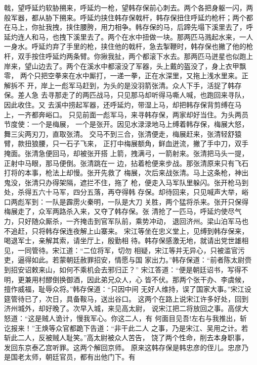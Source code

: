 戟，望呼延灼软胁搠来，呼延灼一枪，望韩存保前心刺去。两个各把身躯一闪，两
般军器，都从胁下搠来。呼延灼挟住韩存保戟杆，韩存保扭住呼延灼枪杆；两个都
在马上，你扯我拽，挟住腰胯，用力相争。韩存保的马，后蹄先塌下溪里去了，呼
延灼连人和马，也拽下溪里去了。两个在水中扭做一块。那两匹马溅起水来，一人
一身水。呼延灼弃了手里的枪，挟住他的戟杆，急去掣鞭时，韩存保也撇了他的枪
杆，双手按住呼延灼两条臂。你揪我扯，两个都滚下水去。那两匹马迸星也似跑上
岸来，望山边去了。两个在溪水中都滚没了军器，头上戴的盔没了，身上衣甲飘零，
两个只把空拳来在水中厮打，一递一拳，正在水深里，又拖上浅水里来。正解拆不
开，岸上一彪军马赶到，为头的是没羽箭张清。众人下手，活捉了韩存保。差人急
去寻那走了的两匹战马，只见那马却听得马嘶人喊，也跑回来寻队，因此收住。又
去溪中捞起军器，还呼延灼，带湿上马，却把韩存保背剪缚在马上，一齐都奔峪口。
只见前面一彪军马，来寻韩存保，两家却好当住。为头两员节度使：一个是梅展，
一个是张开。因见水渌渌地马上缚着韩存保，梅展大怒，舞三尖两刃刀，直取张清。
交马不到三合，张清便走，梅展赶来，张清轻舒猿臂，款扭狼腰，只一石子飞来，
正打中梅展额角，鲜血迸流，撇了手中刀，双手掩面。张清急便回马，却被张开搭
上箭，拽满弓，一箭射来。张清把马头一提，正射中马眼，那马便倒。张清跳在一
边，拈着枪便来步战。那张清原来只有飞石打将的本事，枪法上却慢。张开先救了
梅展，次后来战张清。马上这条枪，神出鬼没，张清只办得架隔，遮拦不住，拖了
枪，便走入马军队里躲闪。张开枪马到处，杀得五六十马军，四分五落，再夺得韩
存保。却待回来，只见喊声大举，峪口两彪军到：一队是霹雳火秦明，一队是大刀
关胜，两个猛将杀来。张开只保得梅展走了，众军两路杀入来，又夺了韩存保。张
清抢了一匹马，呼延灼使尽气力，只好随众厮杀，一齐掩击到官军队前，乘势冲动，
退回济州。梁山泊军马也不追赶，只将韩存保连夜解上山寨来。
宋江等坐在忠义堂上，见缚到韩存保来，喝退军士，亲解其索，请坐厅上，殷勤相
待。韩存保感激无地，就请出党世雄相见，一同管待。宋江道：“二位将军，切勿
相疑，宋江等并无异心，只被滥官污吏，逼得如此。若蒙朝廷赦罪招安，情愿与国
家出力。”韩存保道：“前者陈太尉赍到招安诏敕来山，如何不乘机会去邪归正？”
宋江答道：“便是朝廷诏书，写得不明，更兼用村醪倒换御酒，因此弟兄众人，心
皆不伏。那两个张干办、李虞候，擅作威福，耻辱众将。”韩存保道：“只因中间
无好人维持，误了国家大事。”宋江设筵管待已了，次日，具备鞍马，送出谷口。
这两个在路上说宋江许多好处，回到济州城外，却好晚了。次早入城，来见高太尉，
说宋江把二将放回之事。高俅大怒道：“这是贼人诡计，慢我军心。你这二人，有
何面目见吾!左右与我推出，斩讫报来！”王焕等众官都跪下告道：“非干此二人
之事，乃是宋江、吴用之计。若斩此二人，反被贼人耻笑。”高太尉被众人苦告，
饶了两个性命，削去本身职事，发回东京泰乙宫听罪。这两个解回京师。
原来这韩存保是韩忠彦的侄儿。忠彦乃是国老太师，朝廷官员，都有出他门下。有
